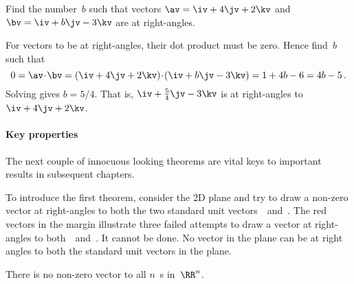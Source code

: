 \begin{example} \label{eg:}
Find the number~\(b\) such that vectors \(\av=\iv+4\jv+2\kv\) and \(\bv=\iv+b\jv-3\kv\) are at right-angles.
\begin{solution} 
For vectors to be at right-angles, their dot product must be zero.
Hence find~\(b\) such that
\begin{equation*}
0=\av\cdot\bv=(\iv+4\jv+2\kv)\cdot(\iv+b\jv-3\kv)
=1+4b-6=4b-5\,.
\end{equation*}
Solving gives \(b=5/4\).
That is, \(\iv+\tfrac54\jv-3\kv\) is at right-angles to \(\iv+4\jv+2\kv\).
\end{solution}
\end{example}



\paragraph{Key properties}
The next couple of innocuous looking theorems are vital keys to important results in subsequent chapters.

To introduce the first theorem, consider the 2D plane and try to draw a non-zero vector at right-angles to both the two standard unit vectors~\iv\ and~\jv.
The red vectors in the margin illustrate three failed attempts to draw a vector at right-angles to both~\iv\ and~\jv.
It cannot be done. 
No vector in the plane can be at right angles to both the standard unit vectors in the plane.


\begin{theorem} \label{thm:nononz}
There is no non-zero vector  to all \(n\)~s in~\(\RR^n\).
\end{theorem}


